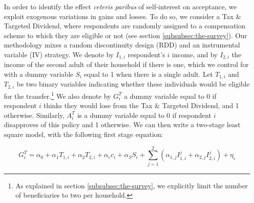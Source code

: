 \documentclass[11pt]{article}
\begin{document}
In order to identify the effect \textit{ceteris paribus} of self-interest on acceptance, we exploit exogenous variations in gains and losses. To do so, we consider a Tax \& Targeted Dividend, where respondents are randomly assigned to a compensation scheme to which they are eligible or not (see section \ref{subsubsec:the-survey}). Our methodology mixes a random discontinuity design (RDD) and an instrumental variable (IV) strategy. We denote by $I_{1,i}$ respondent's $i$ income, and by $I_{2,i}$ the income of the second adult of their household if there is one, which we control for with a dummy variable $S_i$ equal to 1 when there is a single adult. Let $T_{1,i}$ and $T_{2,i}$ be two binary variables indicating whether these individuals would be eligible for the transfer.\footnote{As explained in section \ref{subsubsec:the-survey}, we explicitly limit the number of beneficiaries to two per household.} We also denote by $G_i^T$ a dummy variable equal to 0 if respondent $i$ thinks they would lose from the Tax \& Targeted Dividend, and 1 otherwise. Similarly, $A_i^T$ is a dummy variable equal to 0 if respondent $i$ disapproves of this policy and 1 otherwise. We can then write a two-stage least square model, with the following first stage equation:



\begin{equation}
    G_i^T = \alpha_0 + \alpha_1 T_{1,i} + \alpha_2 T_{2,i} + \alpha_c c_i  + \alpha_S S_i + \sum_{j=1}^2 \left( \alpha_{1,j} I_{1,i}^j + \alpha_{2,j} I_{2,i}^j \right) + \eta_i
    \label{eq:first_stage_parametric_rdd_approve_winner}
\end{equation}
\end{document}
